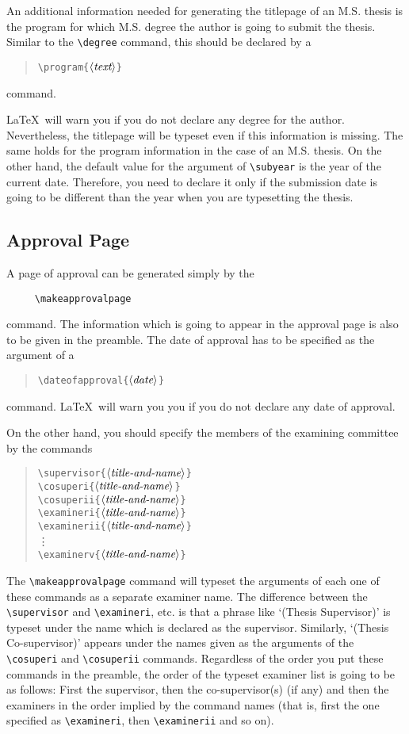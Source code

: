 \documentclass[12pt]{article}
\newcommand{\bq}{\begin{quotation}\noindent}
\newcommand{\eq}{\end{quotation}}
\renewcommand{\arg}[1]{$\langle\mbox{\it #1}\rangle$}
\begin{document}
An additional information needed for generating the titlepage of an
M.S. thesis is the program for which M.S. degree the author is going
to submit the thesis. Similar to the \verb/\degree/ command, this
should be declared by a
\bq
\verb/\program{/\arg{text}\verb/}/
\eq
command.

\LaTeX\ will warn you if you do not declare any degree for the author.
Nevertheless, the titlepage will be typeset even if this information
is missing. The same holds for the program information in the case of
an M.S. thesis. On the other hand, the default value for the argument
of \verb/\subyear/ is the year of the current date. Therefore, you
need to declare it only if the submission date is going to be
different than the year when you are typesetting the thesis.

\subsection{Approval Page}
A page of approval can be generated simply by the
\begin{verbatim}
     \makeapprovalpage
\end{verbatim}
command. The information which is going to appear in the approval
page is also to be given in the preamble. The date of approval has to
be specified as the argument of a
\bq
\verb/\dateofapproval{/\arg{date}\verb/}/
\eq
command. \LaTeX\ will warn you you if you do not declare any date of
approval.

On the other hand, you should specify the members of the examining
committee by the commands
\bq
\verb/\supervisor{/\arg{title-and-name}\verb/}/\\
\verb/\cosuperi{/\arg{title-and-name}\verb/}/\\
\verb/\cosuperii{/\arg{title-and-name}\verb/}/\\
\verb/\examineri{/\arg{title-and-name}\verb/}/\\
\verb/\examinerii{/\arg{title-and-name}\verb/}/\\
\verb//\vdots\\
\verb/\examinerv{/\arg{title-and-name}\verb/}/
\eq

The \verb/\makeapprovalpage/ command will typeset the arguments of
each one of these commands as a separate examiner name. The
difference between the \verb/\supervisor/ and \verb/\examineri/, etc.
is that a phrase like `(Thesis Supervisor)' is typeset under the name
which is declared as the supervisor. Similarly, `(Thesis
Co-supervisor)' appears under the names given as the arguments of the
\verb/\cosuperi/ and \verb/\cosuperii/ commands. Regardless of the
order you put these commands in the preamble, the order of the typeset
examiner list is going to be as follows: First the supervisor, then
the co-supervisor(s) (if any) and then the examiners in the order
implied by the command names (that is, first the one specified as
\verb/\examineri/, then \verb/\examinerii/ and so on).
\end{document}
